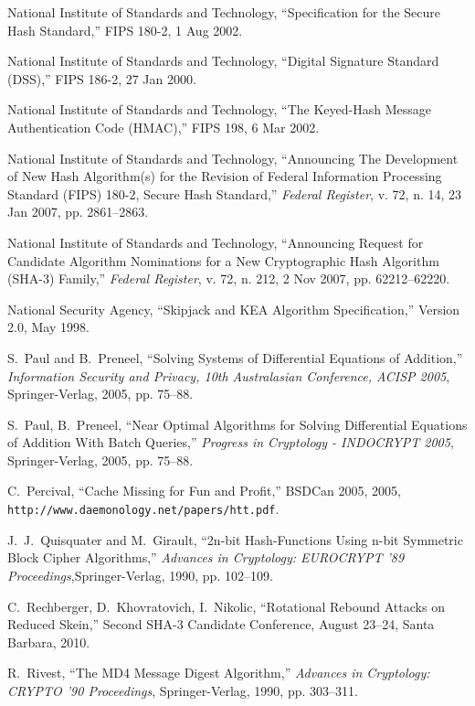 \documentclass[11pt,twoside]{article}
\begin{document}
{\begin{thebibliography}{19}
 National Institute of Standards and Technology, ``Specification for the Secure Hash Standard,'' FIPS 180-2, 1 Aug 2002.

 National Institute of Standards and Technology, ``Digital Signature Standard (DSS),'' FIPS 186-2, 27 Jan 2000.

 National Institute of Standards and Technology, ``The Keyed-Hash Message Authentication Code (HMAC),'' FIPS 198, 6 Mar 2002.

 National Institute of Standards and Technology, ``Announcing The Development of New Hash Algorithm(s) for the Revision of Federal Information Processing Standard (FIPS) 180-2, Secure Hash Standard,'' {\it Federal Register}, v. 72, n. 14, 23 Jan 2007, pp. 2861--2863.

 National Institute of Standards and Technology, ``Announcing Request for Candidate Algorithm Nominations for a New Cryptographic Hash Algorithm (SHA-3) Family,'' {\it Federal Register}, v. 72, n. 212, 2 Nov 2007, pp. 62212--62220.

 National Security Agency, ``Skipjack and KEA Algorithm Specification,'' Version 2.0, May 1998.

 S.~Paul and B.~Preneel, ``Solving Systems of Differential Equations of Addition,'' {\it Information Security and Privacy, 10th Australasian Conference, ACISP 2005}, Springer-Verlag, 2005, pp. 75--88.

 S.~Paul, B.~Preneel, ``Near Optimal Algorithms for Solving Differential Equations of Addition With Batch Queries,'' {\it Progress in Cryptology - INDOCRYPT 2005}, Springer-Verlag, 2005, pp. 75--88.

 C.~Percival, ``Cache Missing for Fun and Profit,'' BSDCan 2005, 2005, {\tt http://www.daemonology.net/papers/htt.pdf}.

 J.~J.~Quisquater and M.~Girault, ``2n-bit Hash-Functions
Using n-bit Symmetric Block Cipher Algorithms,'' {\it Advances in Cryptology: EUROCRYPT '89 Proceedings},Springer-Verlag, 1990, pp. 102--109.

 C.~Rechberger, D.~Khovratovich, I.~Nikolic, 
  ``Rotational Rebound Attacks on Reduced Skein,'' 
  Second SHA-3 Candidate Conference, August 23--24, Santa Barbara, 2010.

 R.~Rivest, ``The MD4 Message Digest Algorithm,'' {\it Advances in Cryptology: CRYPTO '90 Proceedings}, Springer-Verlag, 1990, pp. 303--311.


\end{thebibliography}}
\end{document}
